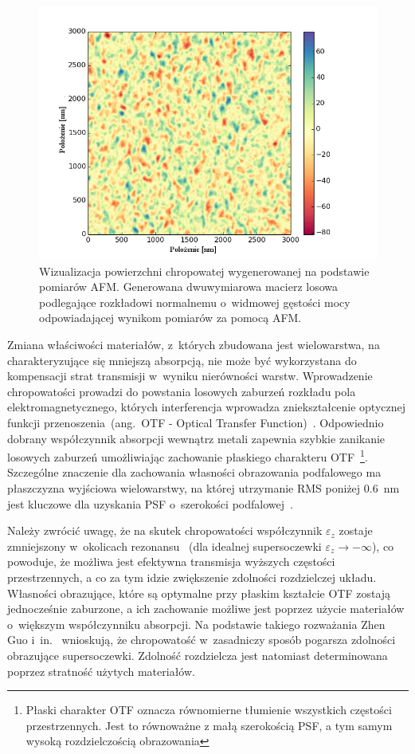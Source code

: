 \begin{figure}[bt]
		\includegraphics[width=\textwidth]{images/multilayer/ag30nm-afm-generated.png}
		\caption{Wizualizacja powierzchni chropowatej wygenerowanej na podstawie pomiarów AFM. Generowana dwuwymiarowa macierz losowa podlegające rozkładowi normalnemu o~widmowej gęstości mocy odpowiadającej wynikom pomiarów za pomocą AFM.} 
		\label{fig:ag30nm-afmgene}
\end{figure}


Zmiana właściwości materiałów, z~których zbudowana jest wielowarstwa, na charakteryzujące się mniejszą absorpcją, nie może być wykorzystana do kompensacji strat transmisji w~wyniku nierówności warstw. Wprowadzenie chropowatości prowadzi do powstania losowych zaburzeń rozkładu pola elektromagnetycznego, których interferencja wprowadza zniekształcenie optycznej funkcji przenoszenia~(ang.~OTF - Optical Transfer Function)~\cite{citeulike:2926459}. Odpowiednio dobrany współczynnik absorpcji wewnątrz metali zapewnia szybkie zanikanie losowych zaburzeń umożliwiając zachowanie płaskiego charakteru OTF~\footnote{Płaski charakter OTF oznacza równomierne tłumienie wszystkich częstości przestrzennych. Jest to równoważne z małą szerokością PSF, a tym samym wysoką rozdzielczością obrazowania}. Szczególne znaczenie dla zachowania własności obrazowania podfalowego ma płaszczyzna wyjściowa wielowarstwy, na której utrzymanie RMS poniżej $0.6$~nm jest kluczowe dla uzyskania PSF o~szerokości podfalowej~\cite{guo2014negative}.

Należy zwrócić uwagę, że na skutek chropowatości współczynnik $\varepsilon_z$ zostaje zmniejszony w~okolicach rezonansu~\cite{guo2014negative} (dla idealnej supersoczewki $\varepsilon_{z} \to - \infty$), co powoduje, że możliwa jest efektywna transmisja wyższych częstości przestrzennych, a co za tym idzie zwiększenie zdolności rozdzielczej układu. Własności obrazujące, które są optymalne przy płaskim kształcie OTF zostają jednocześnie zaburzone, a ich zachowanie możliwe jest poprzez użycie materiałów o~większym współczynniku absorpcji. Na podstawie takiego rozważania Zhen Guo i~in.~\cite{guo2014negative} wnioskują, że chropowatość w~zasadniczy sposób pogarsza zdolności obrazujące supersoczewki. Zdolność rozdzielcza jest natomiast determinowana poprzez stratność użytych materiałów.

